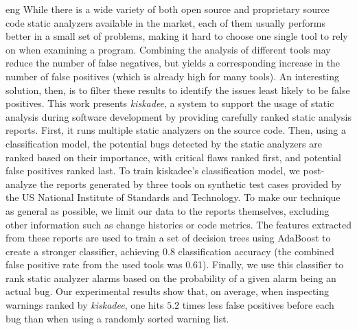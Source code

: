 \begin{resumo}{eng}
While there is a wide variety of both open source and proprietary source code
static analyzers available in the market, each of them usually performs
better in a small set of problems, making it hard to choose one single
tool to rely on when examining a program. Combining the analysis of
different tools may reduce the number of false negatives, but yields a
corresponding increase in the number of false positives (which is
already high for many tools). An interesting solution, then, is to
filter these results to identify the issues least likely to be false
positives.
This work presents \textit{kiskadee}, a system to support the usage of static
analysis during software development by providing carefully ranked static
analysis reports.  First, it runs multiple static analyzers on the source
code. Then, using a classification model, the potential bugs detected by the
static analyzers are ranked based on their importance, with critical flaws
ranked first, and potential false positives ranked last.
To train kiskadee's classification model, we post-analyze the reports generated
by three tools on synthetic test cases provided by the US National Institute
of Standards and Technology. To make our technique as general as
possible, we limit our data to the reports themselves, excluding other
information such as change histories or code metrics. The features extracted
from these reports are used to train a set of decision trees using AdaBoost
to create a stronger classifier, achieving 0.8 classification accuracy (the
combined false positive rate from the used tools was 0.61).  Finally, we use
this classifier to rank static analyzer alarms based on the probability of a
given alarm being an actual bug. Our experimental results show that, on
average, when inspecting warnings ranked by \textit{kiskadee}, one hits $5.2$
times less false positives before each bug than when using a randomly sorted
warning list.
\end{resumo}



